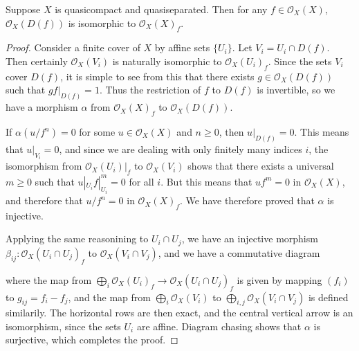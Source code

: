 \begin{theorem} \label{distinguishedneighborhoodslocalizationtheorem}
    Suppose $X$ is quasicompact and quasiseparated. Then for any $f \in \mathcal{O}_X(X)$, $\mathcal{O}_X(D(f))$ is isomorphic to $\mathcal{O}_X(X)_f$.
\end{theorem}
\begin{proof}
    Consider a finite cover of $X$ by affine sets $\{ U_i \}$. Let $V_i = U_i \cap D(f)$. Then certainly $\mathcal{O}_X(V_i)$ is naturally isomorphic to $\mathcal{O}_X(U_i)_f$. Since the sets $V_i$ cover $D(f)$, it is simple to see from this that there exists $g \in \mathcal{O}_X(D(f))$ such that $gf|_{D(f)} = 1$. Thus the restriction of $f$ to $D(f)$ is invertible, so we have a morphism $\alpha$ from $\mathcal{O}_X(X)_f$ to $\mathcal{O}_X(D(f))$.

    If $\alpha(u/f^n) = 0$ for some $u \in \mathcal{O}_X(X)$ and $n \geq 0$, then $u|_{D(f)} = 0$. This means that $u|_{V_i} = 0$, and since we are dealing with only finitely many indices $i$, the isomorphism from $\mathcal{O}_X(U_i)|_f$ to $\mathcal{O}_X(V_i)$ shows that there exists a universal $m \geq 0$ such that $u|_{U_i} f|_{U_i}^m = 0$ for all $i$. But this means that $uf^m = 0$ in $\mathcal{O}_X(X)$, and therefore that $u/f^n = 0$ in $\mathcal{O}_X(X)_f$. We have therefore proved that $\alpha$ is injective.

    Applying the same reasonining to $U_i \cap U_j$, we have an injective morphism $\beta_{ij}: \mathcal{O}_X(U_i \cap U_j)_f$ to $\mathcal{O}_X(V_i \cap V_j)$, and we have a commutative diagram
    \begin{center}
    \end{center}
    where the map from $\bigoplus_i \mathcal{O}_X(U_i)_f \to \mathcal{O}_X(U_i \cap U_j)_f$ is given by mapping $(f_i)$ to $g_{ij} = f_i - f_j$, and the map from $\bigoplus_i \mathcal{O}_X(V_i)$ to $\bigoplus_{i,j} \mathcal{O}_X(V_i \cap V_j)$ is defined similarily. The horizontal rows are then exact, and the central vertical arrow is an isomorphism, since the sets $U_i$ are affine. Diagram chasing shows that $\alpha$ is surjective, which completes the proof.
\end{proof}

